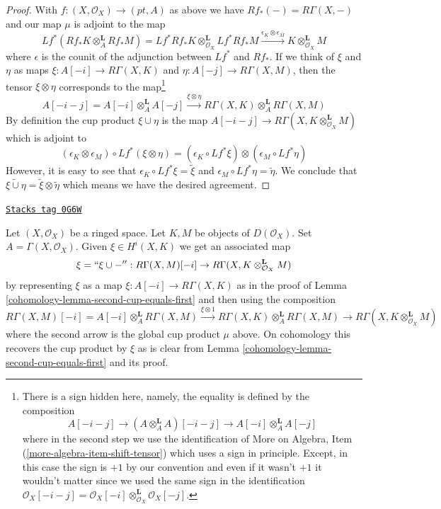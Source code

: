 \begin{proof}
With $f : (X, \mathcal{O}_X) \to (pt, A)$ as above we have
$Rf_*(-) = R\Gamma(X, -)$ and our map $\mu$ is adjoint to the map
$$
Lf^*(Rf_*K \otimes_A^\mathbf{L} Rf_*M) =
Lf^*Rf_*K \otimes_{\mathcal{O}_X}^\mathbf{L} Lf^*Rf_*M
\xrightarrow{\epsilon_K \otimes \epsilon_M}
K \otimes_{\mathcal{O}_X}^\mathbf{L} M
$$
where $\epsilon$ is the counit of the adjunction between
$Lf^*$ and $Rf_*$.
If we think of $\xi$ and $\eta$ as maps $\xi : A[-i] \to R\Gamma(X, K)$
and $\eta : A[-j] \to R\Gamma(X, M)$, then
the tensor $\xi \otimes \eta$ corresponds to the map\footnote{There
is a sign hidden here, namely, the equality is defined by
the composition
$$
A[-i - j] \to (A \otimes_A^\mathbf{L} A)[-i - j] \to
A[-i] \otimes_A^\mathbf{L} A[-j]
$$
where in the second step we use the identification of
More on Algebra, Item (\ref{more-algebra-item-shift-tensor})
which uses a sign in principle.
Except, in this case the sign is $+1$ by our convention and even if it wasn't
$+1$ it wouldn't matter since we used the same sign
in the identification
$\mathcal{O}_X[-i - j] =
\mathcal{O}_X[-i] \otimes_{\mathcal{O}_X}^\mathbf{L} \mathcal{O}_X[-j]$.}
$$
A[-i - j] = A[-i] \otimes_A^\mathbf{L} A[-j]
\xrightarrow{\xi \otimes \eta}
R\Gamma(X, K) \otimes_A^\mathbf{L} R\Gamma(X, M)
$$
By definition the cup product $\xi \cup \eta$ is the map
$A[-i - j] \to R\Gamma(X, K \otimes_{\mathcal{O}_X}^\mathbf{L} M)$
which is adjoint to
$$
(\epsilon_K \otimes \epsilon_M) \circ Lf^*(\xi \otimes \eta) =
(\epsilon_K \circ Lf^*\xi) \otimes (\epsilon_M \circ Lf^*\eta)
$$
However, it is easy to see that
$\epsilon_K \circ Lf^*\xi = \tilde \xi$ and
$\epsilon_M \circ Lf^*\eta = \tilde \eta$.
We conclude that $\widetilde{\xi \cup \eta} = \tilde \xi \otimes \tilde \eta$
which means we have the desired agreement.
\end{proof}

\begin{remark}
\label{cohomology-remark-cup-with-element-map-total-cohomology}
\href{https://stacks.math.columbia.edu/tag/0G6W}{\texttt{Stacks tag 0G6W}}

Let $(X, \mathcal{O}_X)$ be a ringed space. Let $K, M$ be objects
of $D(\mathcal{O}_X)$. Set $A = \Gamma(X, \mathcal{O}_X)$.
Given $\xi \in H^i(X, K)$ we get an associated map
$$
\xi = ``\xi \cup -'' :
R\Gamma(X, M)[-i]
\to
R\Gamma(X, K \otimes_{\mathcal{O}_X}^\mathbf{L} M)
$$
by representing $\xi$ as a map $\xi : A[-i] \to R\Gamma(X, K)$ as in the
proof of Lemma \ref{cohomology-lemma-second-cup-equals-first}
and then using the composition
$$
R\Gamma(X, M)[-i] = A[-i] \otimes_A^\mathbf{L} R\Gamma(X, M)
\xrightarrow{\xi \otimes 1}
R\Gamma(X, K) \otimes_A^\mathbf{L} R\Gamma(X, M)
\to
R\Gamma(X, K \otimes_{\mathcal{O}_X}^\mathbf{L} M)
$$
where the second arrow is the global cup product $\mu$ above.
On cohomology this recovers the cup product by $\xi$ as is clear
from Lemma \ref{cohomology-lemma-second-cup-equals-first} and its proof.
\end{remark}

